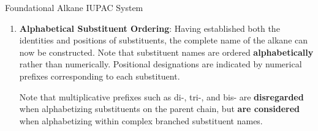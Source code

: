 \documentclass[10pt]{article}
\begin{document}
\begin{core}[label=core:alkane_iupac]{Foundational Alkane IUPAC System}
\begin{enumerate}[label=(\arabic*)]

          \item \textbf{Alphabetical Substituent Ordering}: Having established both the identities and positions of substituents, the complete name of the alkane can now be constructed. Note that substituent names are ordered \textbf{alphabetically} rather than numerically. Positional designations are indicated by numerical prefixes corresponding to each substituent.


          Note that multiplicative prefixes such as di-, tri-, and bis- are \textbf{disregarded} when alphabetizing substituents on the parent chain, but \textbf{are considered} when alphabetizing within complex branched substituent names.


\end{enumerate}
\end{core}
\end{document}
